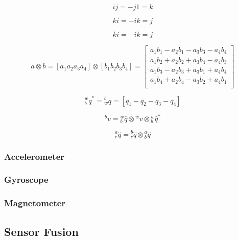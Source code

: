 \begin{equation}
    ij = -j1 = k
\end{equation}

\begin{equation}
    ki = -ik = j
\end{equation}

\begin{equation}
    ki = -ik = j
\end{equation}

\begin{equation}
    a \otimes b = \left[a_1 a_2 a_3 a_4\right] \otimes \left[b_1 b_2 b_3 b_4\right]     =
    \begin{bmatrix}
        a_1 b_1 - a_2 b_1 - a_3 b_3 - a_4 b_4 \\
        a_1 b_2 + a_2 b_2 + a_3 b_4 - a_4 b_3 \\
        a_1 b_3 - a_2 b_3 + a_3 b_1 + a_4 b_4 \\
        a_1 b_4 + a_2 b_4 - a_3 b_2 + a_4 b_1 \\
    \end{bmatrix}
\end{equation}

\begin{equation}
    \textrm{$_{b}^{w}q$}^* =\textrm{$_{w}^{b}q$} = \left[q_1 - q_2 - q_3 - q_4\right]
\end{equation}

\begin{equation}
    \textrm{$^{b}v$} = \textrm{$_{b}^{w}\hat{q}$} \otimes \textrm{$^{w}v$} \otimes \textrm{$_{b}^{w}\hat{q}$}^*
\end{equation}

\begin{equation}
    \textrm{$_{c}^{a}\hat{q}$} = \textrm{$_{c}^{b}\hat{q}$} \otimes \textrm{$_{b}^{a}\hat{q}$}
\end{equation}

\subsubsection{Accelerometer}
\subsubsection{Gyroscope}
\subsubsection{Magnetometer}
\subsection{Sensor Fusion}
